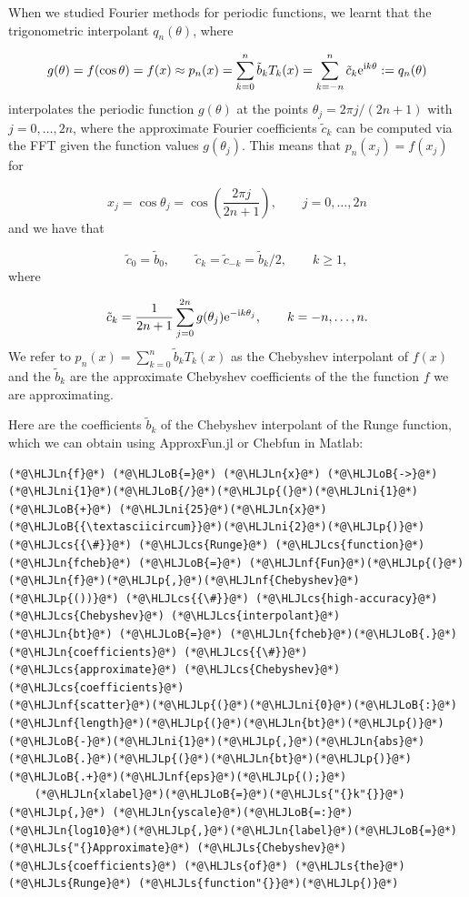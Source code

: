 \documentclass[12pt,a4paper]{article}
\newcommand{\HLJLn}[1]{#1}
\newcommand{\HLJLnf}[1]{\textcolor[RGB]{66,102,213}{#1}}
\newcommand{\HLJLs}[1]{\textcolor[RGB]{201,61,57}{#1}}
\newcommand{\HLJLni}[1]{\textcolor[RGB]{59,151,46}{#1}}
\newcommand{\HLJLoB}[1]{\textcolor[RGB]{102,102,102}{\textbf{#1}}}
\newcommand{\HLJLp}[1]{#1}
\newcommand{\HLJLcs}[1]{\textcolor[RGB]{153,153,119}{\textit{#1}}}
\begin{document}
When we studied Fourier methods for periodic functions, we learnt that the trigonometric interpolant $q_n(\theta)$, where


\begin{eqnarray*}
g(\theta) = f(\cos\theta) = f(x) \approx p_n(x) = \sum_{k=0}^{n} \tilde{b}_kT_k(x) = \sum_{k=-n}^{n} \tilde{c}_k {\rm e}^{{\rm i}k\theta} := q_n(\theta)
\end{eqnarray*}
interpolates the periodic function $g(\theta)$ at the points $\theta_j = 2\pi j/(2n+1)$ with $j = 0, \ldots, 2n$, where the approximate Fourier coefficients $\tilde{c}_k$ can be computed via the FFT given the function values $g(\theta_j)$.  This means that $p_n(x_j) = f(x_j)$ for 

\[
    x_j = \cos\theta_j = \cos\left( \frac{2\pi j}{2n + 1}  \right), \qquad j = 0, \ldots, 2n 
\]
and we have that

\[
\tilde{c}_0 = \tilde{b}_0,\qquad  \tilde{c}_{k} = \tilde{c}_{-k} = \tilde{b}_k/2,\qquad k\geq 1,
\]
where

\[
\tilde{c}_k = \frac{1}{2n+1}\sum_{j = 0}^{2n} g(\theta_j) {\rm e}^{-{\rm i}k\theta_j}, \qquad k = -n, \ldots, n.
\]
We refer to $p_n(x) = \sum_{k=0}^{n} \tilde{b}_kT_k(x)$ as the Chebyshev interpolant of $f(x)$ and the $\tilde{b}_k$ are the approximate Chebyshev coefficients of the the function $f$ we are approximating.

Here are the coefficients $\tilde{b}_k$ of the Chebyshev interpolant of the Runge function, which we can obtain using ApproxFun.jl or Chebfun in Matlab:


\begin{lstlisting}
(*@\HLJLn{f}@*) (*@\HLJLoB{=}@*) (*@\HLJLn{x}@*) (*@\HLJLoB{->}@*) (*@\HLJLni{1}@*)(*@\HLJLoB{/}@*)(*@\HLJLp{(}@*)(*@\HLJLni{1}@*) (*@\HLJLoB{+}@*) (*@\HLJLni{25}@*)(*@\HLJLn{x}@*)(*@\HLJLoB{{\textasciicircum}}@*)(*@\HLJLni{2}@*)(*@\HLJLp{)}@*) (*@\HLJLcs{{\#}}@*) (*@\HLJLcs{Runge}@*) (*@\HLJLcs{function}@*)
(*@\HLJLn{fcheb}@*) (*@\HLJLoB{=}@*) (*@\HLJLnf{Fun}@*)(*@\HLJLp{(}@*)(*@\HLJLn{f}@*)(*@\HLJLp{,}@*)(*@\HLJLnf{Chebyshev}@*)(*@\HLJLp{())}@*) (*@\HLJLcs{{\#}}@*) (*@\HLJLcs{high-accuracy}@*) (*@\HLJLcs{Chebyshev}@*) (*@\HLJLcs{interpolant}@*)
(*@\HLJLn{bt}@*) (*@\HLJLoB{=}@*) (*@\HLJLn{fcheb}@*)(*@\HLJLoB{.}@*)(*@\HLJLn{coefficients}@*) (*@\HLJLcs{{\#}}@*) (*@\HLJLcs{approximate}@*) (*@\HLJLcs{Chebyshev}@*) (*@\HLJLcs{coefficients}@*)
(*@\HLJLnf{scatter}@*)(*@\HLJLp{(}@*)(*@\HLJLni{0}@*)(*@\HLJLoB{:}@*)(*@\HLJLnf{length}@*)(*@\HLJLp{(}@*)(*@\HLJLn{bt}@*)(*@\HLJLp{)}@*)(*@\HLJLoB{-}@*)(*@\HLJLni{1}@*)(*@\HLJLp{,}@*)(*@\HLJLn{abs}@*)(*@\HLJLoB{.}@*)(*@\HLJLp{(}@*)(*@\HLJLn{bt}@*)(*@\HLJLp{)}@*)(*@\HLJLoB{.+}@*)(*@\HLJLnf{eps}@*)(*@\HLJLp{();}@*)
    (*@\HLJLn{xlabel}@*)(*@\HLJLoB{=}@*)(*@\HLJLs{"{}k"{}}@*)(*@\HLJLp{,}@*) (*@\HLJLn{yscale}@*)(*@\HLJLoB{=:}@*)(*@\HLJLn{log10}@*)(*@\HLJLp{,}@*)(*@\HLJLn{label}@*)(*@\HLJLoB{=}@*)(*@\HLJLs{"{}Approximate}@*) (*@\HLJLs{Chebyshev}@*) (*@\HLJLs{coefficients}@*) (*@\HLJLs{of}@*) (*@\HLJLs{the}@*) (*@\HLJLs{Runge}@*) (*@\HLJLs{function"{}}@*)(*@\HLJLp{)}@*)
\end{lstlisting}
\end{document}
